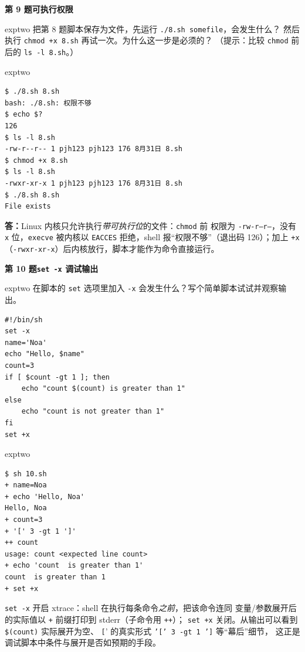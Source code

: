 \documentclass[11pt,a4paper,fontset=none]{ctexart}
\newcommand{\hwbanner}[3]{%
  \par\vspace{1.1em}
  \begin{tcolorbox}[enhanced, colback=#1!8, colframe=#1!75!black,
    boxrule=0.8pt, arc=2pt, left=7pt, right=7pt, top=4pt, bottom=4pt,
    before skip=1.1em]
    {\bfseries\color{#1!75!black}#2\qquad #3}
  \end{tcolorbox}
  \par\vspace{0.1em}\noindent\ignorespaces
}
\newcommand{\sublabel}[2]{%
  \par\vspace{0.8em}\noindent{\bfseries\color{#1!75!black}#2}\par\nobreak\vspace{0.25em}\noindent\ignorespaces
}
\begin{document}
\hwbanner{exptwo}{第 9 题}{可执行权限}
\begin{reqbox}{exptwo}
  把第 8 题脚本保存为文件，先运行 \texttt{./8.sh somefile}，会发生什么？
  然后执行 \texttt{chmod +x 8.sh} 再试一次。为什么这一步是必须的？
  （提示：比较 \texttt{chmod} 前后的 \texttt{ls -l 8.sh}。）
\end{reqbox}
\begin{resbox}{exptwo}
\begin{lstlisting}[style=output]
$ ./8.sh 8.sh
bash: ./8.sh: 权限不够
$ echo $?
126
$ ls -l 8.sh
-rw-r--r-- 1 pjh123 pjh123 176 8月31日 8.sh
$ chmod +x 8.sh
$ ls -l 8.sh
-rwxr-xr-x 1 pjh123 pjh123 176 8月31日 8.sh
$ ./8.sh 8.sh
File exists
\end{lstlisting}
\textbf{答：}Linux 内核只允许执行\emph{带可执行位}的文件：\texttt{chmod} 前
权限为 \texttt{-rw-r--r--}，没有 \texttt{x} 位，\texttt{execve} 被内核以
\texttt{EACCES} 拒绝，shell 报“权限不够”（退出码 126）；加上 \texttt{+x}
（\texttt{-rwxr-xr-x}）后内核放行，脚本才能作为命令直接运行。
\end{resbox}

\hwbanner{exptwo}{第 10 题}{\texttt{set -x} 调试输出}
\begin{reqbox}{exptwo}
  在脚本的 \texttt{set} 选项里加入 \texttt{-x} 会发生什么？写个简单脚本试试并观察输出。
\end{reqbox}
\sublabel{exptwo}{\faCode\ 解答（\texttt{10.sh}）}
\begin{lstlisting}[style=shell]
#!/bin/sh
set -x
name='Noa'
echo "Hello, $name"
count=3
if [ $count -gt 1 ]; then
    echo "count $(count) is greater than 1"
else
    echo "count is not greater than 1"
fi
set +x
\end{lstlisting}
\begin{resbox}{exptwo}
\begin{lstlisting}[style=output]
$ sh 10.sh
+ name=Noa
+ echo 'Hello, Noa'
Hello, Noa
+ count=3
+ '[' 3 -gt 1 ']'
++ count
usage: count <expected line count>
+ echo 'count  is greater than 1'
count  is greater than 1
+ set +x
\end{lstlisting}
\texttt{set -x} 开启 xtrace：shell 在执行每条命令\emph{之前}，把该命令连同
变量/参数展开后的实际值以 \texttt{+} 前缀打印到 stderr（子命令用 \texttt{++}）；
\texttt{set +x} 关闭。从输出可以看到 \texttt{\$(count)} 实际展开为空、
\texttt{[}' 的真实形式 \texttt{'[' 3 -gt 1 ']} 等“幕后”细节，
这正是调试脚本中条件与展开是否如预期的手段。
\end{resbox}
\end{document}
